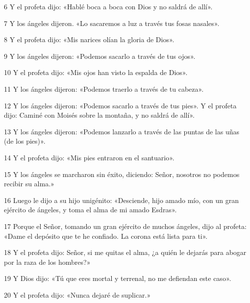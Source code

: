 \par 6 Y el profeta dijo: «Hablé boca a boca con Dios y no saldrá de allí».

\par 7 Y los ángeles dijeron. «Lo sacaremos a luz a través tus fosas nasales».

\par 8 Y el profeta dijo: «Mis narices olían la gloria de Dios».

\par 9 Y los ángeles dijeron: «Podemos sacarlo a través de tus ojos». 

\par 10 Y el profeta dijo: «Mis ojos han visto la espalda de Dios».

\par 11 Y los ángeles dijeron: «Podemos traerlo a través de tu cabeza».

\par 12 Y los ángeles dijeron: «Podemos sacarlo a través de tus pies». Y el profeta dijo: Caminé con Moisés sobre la montaña, y no saldrá de allí».

\par 13 Y los ángeles dijeron: «Podemos lanzarlo a través de las puntas de las uñas (de los pies)».

\par 14 Y el profeta dijo: «Mis pies entraron en el santuario». 

\par 15 Y los ángeles se marcharon sin éxito, diciendo: Señor, nosotros no podemos recibir su alma.»

\par 16 Luego le dijo a su hijo unigénito: «Desciende, hijo amado mío, con un gran ejército de ángeles, y toma el alma de mi amado Esdras».

\par 17 Porque el Señor, tomando un gran ejército de muchos ángeles, dijo al profeta: «Dame el depósito que te he confiado. La corona está lista para ti».

\par 18 Y el profeta dijo: Señor, si me quitas el alma, ¿a quién le dejarás para abogar por la raza de los hombres?»

\par 19 Y Dios dijo: «Tú que eres mortal y terrenal, no me defiendan este caso».

\par 20 Y el profeta dijo: «Nunca dejaré de suplicar.»

